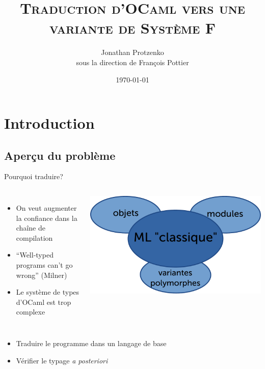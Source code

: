 \documentclass[final]{beamer}
\title{\textsc{Traduction d'OCaml vers une variante de Système F}}
\author{Jonathan Protzenko\\sous la direction de François Pottier}
\date{\today}
\begin{document}
\makeatletter
\beamer@compressfalse
\makeatother

\begin{frame}
  \titlepage
\end{frame}

\section{Introduction}

\subsection{Aperçu du problème}

\begin{frame}{Pourquoi traduire?}
  \begin{columns}
      \begin{itemize}
        \item On veut augmenter la confiance dans la chaîne de compilation
        \item ``Well-typed programs can't go wrong'' (Milner)
        \item Le système de types d'OCaml est trop complexe
      \end{itemize}
      \includegraphics[width=\columnwidth]{ocaml.pdf}
  \end{columns}
  \begin{itemize}
    \item Traduire le programme dans un langage de base
    \item Vérifier le typage \emph{a posteriori}
  \end{itemize}
\end{frame}

\end{document}
